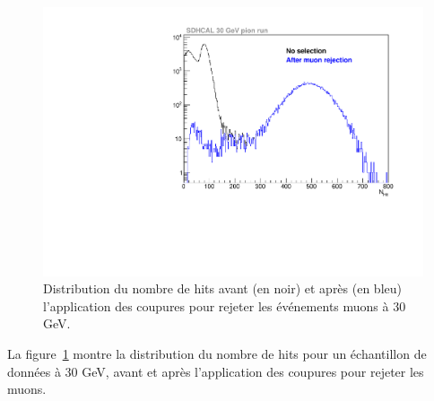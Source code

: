 \begin{figure}[!ht]
  \begin{center}
    \includegraphics[width=.8\textwidth]{SDHCAL/figs/muCut715747.pdf}
    \caption{Distribution du nombre de hits avant (en noir) et après (en bleu) l'application des coupures pour rejeter les événements muons à 30 GeV.}
    \label{fig:muCut}
  \end{center}
\end{figure}
La figure~\ref{fig:muCut} montre la distribution du nombre de hits pour un échantillon de données à 30 GeV, avant et après l'application des coupures pour rejeter les muons.
